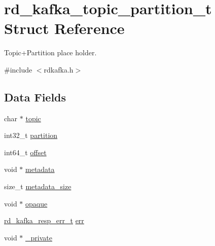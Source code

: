 \hypertarget{structrd__kafka__topic__partition__t}{
\section{rd\_\-kafka\_\-topic\_\-partition\_\-t Struct Reference}
\label{structrd__kafka__topic__partition__t}
}


Topic+Partition place holder.  


{\ttfamily \#include $<$rdkafka.h$>$}\subsection*{Data Fields}
\begin{DoxyCompactItemize}
\item 
char $\ast$ \hyperlink{structrd__kafka__topic__partition__t_a981a6411337ecf5d95e6ab48d1071177}{topic}
\item 
int32\_\-t \hyperlink{structrd__kafka__topic__partition__t_aa37d08c9e5f4612f5a962405c65ae2c1}{partition}
\item 
int64\_\-t \hyperlink{structrd__kafka__topic__partition__t_a60c27c6a2f759b7fdfd382b93c12cd3c}{offset}
\item 
void $\ast$ \hyperlink{structrd__kafka__topic__partition__t_aa2a3d40daa1b0158186f3584886da5dc}{metadata}
\item 
size\_\-t \hyperlink{structrd__kafka__topic__partition__t_a6f3387092692f325404bf3929247eede}{metadata\_\-size}
\item 
void $\ast$ \hyperlink{structrd__kafka__topic__partition__t_a8ab6583124ba3e7382be5b2148672a4c}{opaque}
\item 
\hyperlink{rdkafka_8h_a03509bab51072c72a8dcf52337e6d5cb}{rd\_\-kafka\_\-resp\_\-err\_\-t} \hyperlink{structrd__kafka__topic__partition__t_ab9370931853903657d7cabc9643d336e}{err}
\item 
void $\ast$ \hyperlink{structrd__kafka__topic__partition__t_ac41b2fea58ecc44fd8c99780ed9f6389}{\_\-private}
\end{DoxyCompactItemize}


